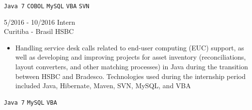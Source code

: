 \documentclass[9pt]{developercv} %
\begin{document}
\begin{entrylist}
{\begin{itemize}[noitemsep,topsep=0pt,parsep=0pt,partopsep=0pt, leftmargin=-1pt]
        \end{itemize} 
        \texttt{Java 7} \slashsep \texttt{COBOL} \slashsep \texttt{MySQL} \slashsep \texttt{VBA} \slashsep \texttt{SVN}}
        	\entry
		{5/2016 - 10/2016}
		{Intern \\\footnotesize{Curitiba - Brasil}}
		{HSBC}
		{\vspace{-10pt}
        \begin{itemize}[noitemsep,topsep=0pt,parsep=0pt,partopsep=0pt, leftmargin=-1pt]
            \item Handling service desk calls related to end-user computing (EUC) support, as well as developing and improving projects for asset inventory (reconciliations, layout converters, and other matching processes) in Java during the transition between HSBC and Bradesco. Technologies used during the internship period included Java, Hibernate, Maven, SVN, MySQL, and VBA
        \end{itemize} 
        \texttt{Java 7} \slashsep \texttt{MySQL} \slashsep \texttt{VBA}}
\end{entrylist}
\end{document}
